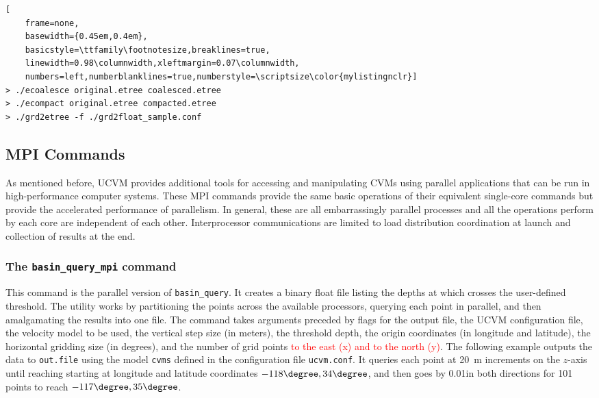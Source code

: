 \begin{lstlisting}[
	frame=none,
	basewidth={0.45em,0.4em},
	basicstyle=\ttfamily\footnotesize,breaklines=true,
	linewidth=0.98\columnwidth,xleftmargin=0.07\columnwidth,
	numbers=left,numberblanklines=true,numberstyle=\scriptsize\color{mylistingnclr}]
> ./ecoalesce original.etree coalesced.etree
> ./ecompact original.etree compacted.etree
> ./grd2etree -f ./grd2float_sample.conf
\end{lstlisting}

\subsection{MPI Commands}

As mentioned before, UCVM provides additional tools for accessing and manipulating CVMs using parallel applications that can be run in high-performance computer systems. These MPI commands provide the same basic operations of their equivalent single-core commands but provide the accelerated performance of parallelism. In general, these are all embarrassingly parallel processes and all the operations perform by each core are independent of each other. Interprocessor communications are limited to load distribution coordination at launch and collection of results at the end.

\subsubsection{The \textup{\texttt{basin\_query\_mpi}} command}

This command is the parallel version of \texttt{basin\_query}. It creates a binary float file listing the depths at which \vs{} crosses the user-defined threshold. The utility works by partitioning the points across the available processors, querying each point in parallel, and then amalgamating the results into one file. The command takes arguments preceded by flags for the output file, the UCVM configuration file, the velocity model to be used, the vertical step size (in meters), the threshold depth, the origin coordinates (in longitude and latitude), the horizontal gridding size (in degrees), and the number of grid points \textcolor{red}{to the east (x) and to the north (y)}. The following example outputs the data to \texttt{out.file} using the model \texttt{cvms} defined in the configuration file \texttt{ucvm.conf}. It queries each point at 20~m increments on the $z$-axis until reaching  starting at longitude and latitude coordinates $-118\degree, 34\degree$, and then goes by 0.01\textdegree in both directions for 101 points to reach $-117\degree, 35\degree$.


